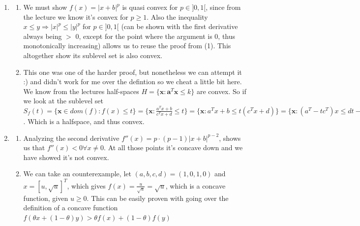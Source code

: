 \documentclass[11pt]{article}
\begin{document}
\begin{enumerate}
    \item \begin{enumerate}
        \item We must show $f(x) = |x+b|^p$ is quasi convex for $p\in]0,1[$, since from the lecture we know it's convex for $p \geq 1$. Also the inequality $x \leq y \Rightarrow |x|^p \leq |y|^p$ for $p \in ]0,1[$ (can be shown with the first derivative always being $>$ 0, except for the point where the argument is 0, thus monotonically increasing) allows us to reuse the proof from (1). This altogether show its sublevel set is also convex.
        \item This one was one of the harder proof, but nonetheless we can attempt it :) and didn't work for me over the defintion so we cheat a little bit here. We know from the lectures half-spaces $H = \{\mathbf{x} : \mathbf{a}^T\mathbf{x} \leq k \}$ are convex. So if we look at the sublevel set $S_f(t) = \{ \mathbf{x} \in dom(f): f(x) \leq t \} = \{\mathbf{x} : \frac{a^Tx + b}{c^Tx + d} \leq t \} = \{\mathbf{x} : a^Tx + b \leq t(c^Tx + d) \} = \{\mathbf{x} : (a^T-t c^T) x\leq dt - b \}$. Which is a halfspace, and thus convex.
        
    \end{enumerate}
    
    \item \begin{enumerate}
        \item Analyzing the second derivative $f''(x)= p \cdot (p-1)|x+b|^{p-2}$, shows us that $f''(x) < 0 \forall x\neq 0$. At all those points it's concave down and we have showed it's not convex.  
        \item We can take an counterexample, let $(a,b,c,d) = (1, 0, 1, 0)$ and $x = [u, \sqrt{u}]^T$, which gives $f(x) = \frac{u}{\sqrt{u}} = \sqrt{u}$, which is a concave function, given $u \geq 0$. This can be easily proven with going over the definition of a concave function $f(\theta x + (1-\theta)y) > \theta f(x) + (1-\theta)f(y)$       
    \end{enumerate}
    
    
\end{enumerate}
\end{document}
